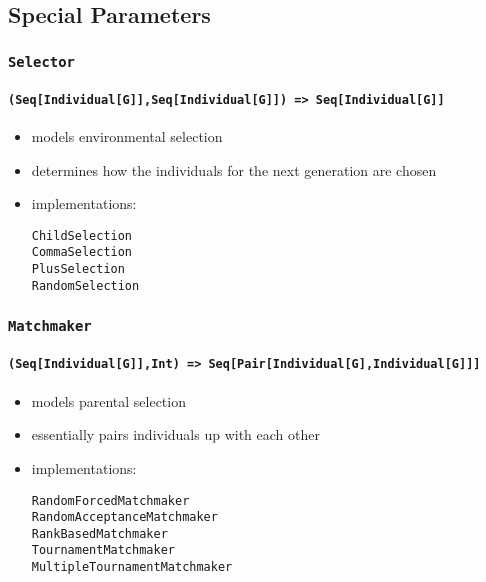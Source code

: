 \documentclass[compress,xcolor=table]{beamer}
\begin{document}
\subsection{Special Parameters}

\begin{frame}
  \frametitle{\texttt{Selector}}
  \framesubtitle{\texttt{(Seq[Individual[G]],Seq[Individual[G]]) => Seq[Individual[G]]}}
  \begin{itemize}
    \item models environmental selection
    \item determines how the individuals for the next generation are chosen
    \item implementations:
    \begin{description}
      \item[\texttt{ChildSelection}]
      \item[\texttt{CommaSelection}]
      \item[\texttt{PlusSelection}]
      \item[\texttt{RandomSelection}]
    \end{description}
  \end{itemize}
\end{frame}

\begin{frame}
  \frametitle{\texttt{Matchmaker}}
  \framesubtitle{\texttt{(Seq[Individual[G]],Int) => Seq[Pair[Individual[G],Individual[G]]]}}
  \begin{itemize}
    \item models parental selection
    \item essentially pairs individuals up with each other
    \item implementations:
    \begin{description}
      \item[\texttt{RandomForcedMatchmaker}]
      \item[\texttt{RandomAcceptanceMatchmaker}]
      \item[\texttt{RankBasedMatchmaker}]
      \item[\texttt{TournamentMatchmaker}]
      \item[\texttt{MultipleTournamentMatchmaker}]
    \end{description}
  \end{itemize}
\end{frame}
\end{document}
